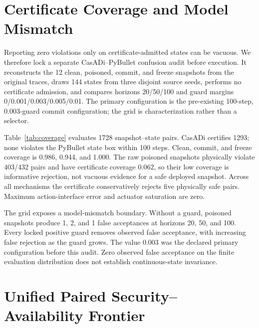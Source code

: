 \section{Certificate Coverage and Model Mismatch}
\label{sec:appendix-coverage}

Reporting zero violations only on certificate-admitted states can be
vacuous.  We therefore lock a separate CasADi--PyBullet confusion audit before
execution.  It reconstructs the 12 clean, poisoned, commit, and freeze
snapshots from the original traces, draws 144 states from three disjoint
source seeds, performs no certificate admission, and compares horizons
20/50/100 and guard margins 0/0.001/0.003/0.005/0.01.  The primary
configuration is the pre-existing 100-step, 0.003-guard commit configuration;
the grid is characterization rather than a selector.

\begin{table}[t]
\centering
\caption{CasADi--PyBullet coverage at the pre-existing 100-step, 0.003-guard
configuration.  Each row pools three learner snapshots over the same 144
states.}
\label{tab:coverage}

\end{table}

Table~\ref{tab:coverage} evaluates 1728 snapshot--state pairs.  CasADi
certifies 1293; none violates the PyBullet state box within 100 steps.
Clean, commit, and freeze coverage is 0.986, 0.944, and 1.000.  The raw
poisoned snapshots physically violate 403/432 pairs and have certificate
coverage 0.062, so their low coverage is informative rejection, not vacuous
evidence for a safe deployed snapshot.  Across all mechanisms the
certificate conservatively rejects five physically safe pairs.  Maximum
action-interface error and actuator saturation are zero.

The grid exposes a model-mismatch boundary.  Without a guard, poisoned
snapshots produce 1, 2, and 1 false acceptances at horizons 20, 50, and 100.
Every locked positive guard removes observed false acceptance, with increasing
false rejection as the guard grows.  The value 0.003 was the declared primary
configuration before this audit.  Zero observed false acceptance on the finite
evaluation distribution does not establish continuous-state invariance.


\section{Unified Paired Security--Availability Frontier}
\label{sec:appendix-frontier}

